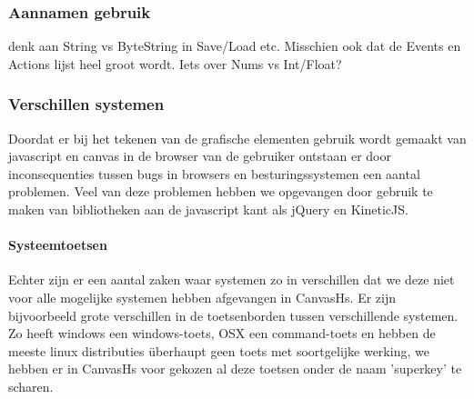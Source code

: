 \subsubsection{Aannamen gebruik}
denk aan String vs ByteString in Save/Load etc. Misschien ook dat de Events en Actions lijst heel groot wordt. Iets over Nums vs Int/Float?

\subsubsection{Verschillen systemen}
Doordat er bij het tekenen van de grafische elementen gebruik wordt gemaakt van javascript en canvas in de browser van de gebruiker ontstaan er door inconsequenties tussen bugs in browsers en besturingssystemen een aantal problemen. Veel van deze problemen hebben we opgevangen door gebruik te maken van bibliotheken aan de javascript kant als jQuery en KineticJS. 

\paragraph{Systeemtoetsen}Echter zijn er een aantal zaken waar systemen zo in verschillen dat we deze niet voor alle mogelijke systemen hebben afgevangen in CanvasHs. Er zijn bijvoorbeeld grote verschillen in de toetsenborden tussen verschillende systemen. Zo heeft windows een windows-toets, OSX een command-toets en hebben de meeste linux distributies überhaupt geen toets met soortgelijke werking, we hebben er in CanvasHs voor gekozen al deze toetsen onder de naam 'superkey' te scharen.
